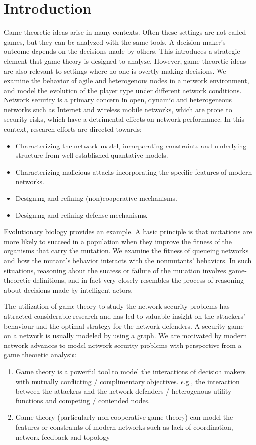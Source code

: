 \documentclass[10pt]{article}
\theoremstyle{definition}
\begin{document}
\section{Introduction}

Game-theoretic ideas arise in many contexts. Often these settings are not called games, but they 
can be analyzed with the same tools. A decision-maker’s outcome depends on the decisions made by others. This 
introduces a strategic element that game theory is designed to analyze. However, game-theoretic 
ideas are also relevant to settings where no one is overtly making decisions. We
examine the behavior of agile and heterogenous nodes in a network environment, and model the
evolution of the player type under different network conditions. 
Network security is a primary concern in open, 
dynamic and heterogeneous networks such as Internet and wireless mobile networks, 
which are prone to security risks, which have a detrimental effects on network performance. In this context,
research efforts are directed towards:
\begin{itemize}
    \item Characterizing the network model, incorporating constraints and
    underlying structure from well established quantative models.
	\item Characterizing malicious attacks incorporating the specific features of modern networks.
	\item Designing and refining (non)cooperative mechanisms.
	\item Designing and refining defense mechanisms.
\end{itemize}
Evolutionary biology provides an example. A basic principle is that mutations are more likely 
to succeed in a population when they improve the fitness of the organisms that carry the mutation. 
We examine the fitness of queueing networks and how the mutant’s behavior interacts with the nonmutants’ behaviors. In such situations, reasoning about the success or failure of the mutation involves 
game-theoretic definitions, and in fact very closely resembles the process of reasoning about 
decisions made by intelligent actors. 

The utilization of game theory to study the network security problems has attracted considerable 
research and has led to valuable insight on the attackers’ behaviour and the optimal strategy for 
the network defenders. A security game on a network is usually modeled by using a graph. We are motivated by modern network advances
to model network security problems with perspective from a game theoretic analysis:
\begin{enumerate}
	\item Game theory is a powerful tool to model the 
interactions of decision makers with mutually conflicting / complimentary objectives.
 e.g., the interaction between the attackers and the network defenders /
 heterogenous utility functions and competing / contended nodes.
	\item Game theory (particularly non-cooperative game theory) can model the
    features or constraints of modern networks such as lack of coordination,
    network feedback and topology.
\end{enumerate}
\end{document}
